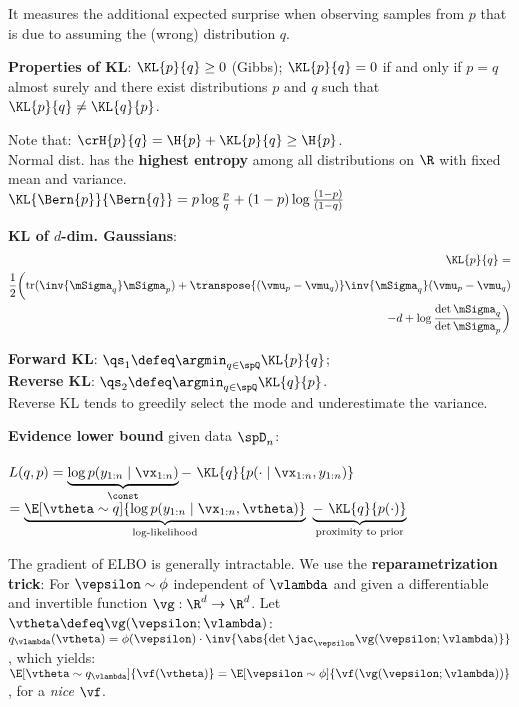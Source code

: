 It measures the additional expected surprise when observing samples from $p$ that is due to assuming the (wrong) distribution $q$.
\begin{framed}
    \textbf{Properties of KL}:
    $\KL{p}{q} \geq 0$ (Gibbs); $\KL{p}{q} = 0$ if and only if $p = q$ almost surely and there exist distributions $p$ and $q$ such that $\KL{p}{q} \neq \KL{q}{p}$.
\end{framed}
Note that: $\crH{p}{q} = \H{p} + \KL{p}{q} \geq \H{p}$.\\
Normal dist. has the \textbf{highest entropy} among all distributions on $\R$ with fixed mean and variance. \\
$\KL{\Bern{p}}{\Bern{q}} = p \log \frac{p}{q} + (1-p) \log \frac{(1-p)}{(1-q)}$  \\
\begin{framed}
    \textbf{KL of $d$-dim. Gaussians}: \\
    \begin{align*}
        \KL{p}{q} = \\
         \frac{1}{2} \bigg(\mathrm{tr}(\inv{\mSigma_q} \mSigma_p)+ \transpose{(\vmu_p - \vmu_q)} \inv{\mSigma_q} (\vmu_p - \vmu_q) \\
        - d + \log \frac{\det{\mSigma_q}}{\det{\mSigma_p}}\bigg)
    \end{align*}
\end{framed}
\textbf{Forward KL}: $\qs_1 \defeq \argmin_{q \in \spQ} \KL{p}{q}$;\\
\textbf{Reverse KL}: $\qs_2 \defeq \argmin_{q \in \spQ} \KL{q}{p}$.\\
Reverse KL tends to greedily select the mode and underestimate the variance.
\vspace{1mm}
\begin{framed}
    \textbf{Evidence lower bound} given data $\spD_n$:\\ \\

        $L(q, p) = \underbrace{\log p(y_{1:n} \mid \vx_{1:n})}_{\const} -\ \KL{q}{p(\cdot \mid \vx_{1:n}, y_{1:n})}$ \\
        $= \underbrace{\E[\vtheta \sim q]{\log p(y_{1:n} \mid \vx_{1:n}, \vtheta)}}_{\text{log-likelihood}}\ \underbrace{-\ \KL{q}{p(\cdot)}}_{\text{proximity to prior}}$
\end{framed}
The gradient of ELBO is generally intractable. We use the \textbf{reparametrization trick}: For $\vepsilon \sim \phi$ independent of $\vlambda$ and given a differentiable and invertible function $\vg : \R^d \to \R^d$. Let $\vtheta \defeq \vg(\vepsilon; \vlambda)$: $q_\vlambda(\vtheta) = \phi(\vepsilon) \cdot \inv{\abs{\det{\jac_\vepsilon \vg(\vepsilon; \vlambda)}}}$, which yields: $\E[\vtheta \sim q_\vlambda]{\vf(\vtheta)} = \E[\vepsilon \sim \phi]{\vf(\vg(\vepsilon; \vlambda))}$, for a \textit{nice} $\vf$. \\
